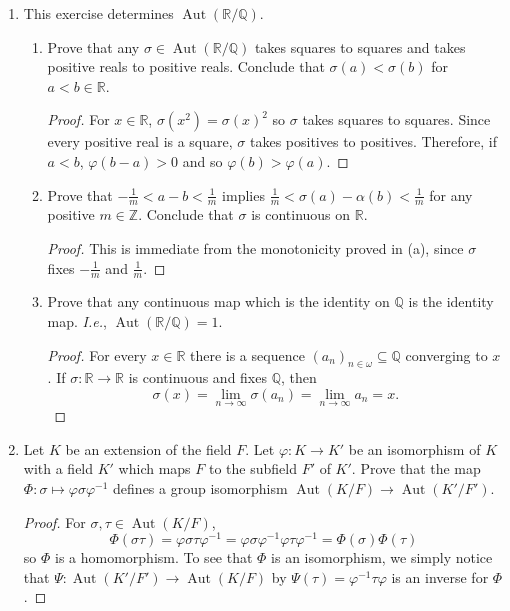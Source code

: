 \documentclass{report}
\newcommand{\Z}{\mathbb{Z}}
\newcommand{\Q}{\mathbb{Q}}
\newcommand{\R}{\mathbb{R}}
\DeclareMathOperator{\Aut}{Aut}
\begin{document}
\begin{enumerate}
\begin{enumerate} [label=(\alph*)]
		\end{enumerate}
	\item This exercise determines $\Aut(\R / \Q)$.
		\begin{enumerate} [label=(\alph*)]
			\item Prove that any $\sigma\in\Aut(\R/\Q)$ takes squares to squares and takes positive reals to positive reals. Conclude that $\sigma(a)<\sigma(b)$ for $a<b\in\R$. 
				\begin{proof}
					For $x\in\R$, $\sigma(x^2)=\sigma(x)^2$ so $\sigma$ takes squares to squares. Since every positive real is a square,
					$\sigma$ takes positives to positives. Therefore, if $a<b$, $\varphi(b-a)>0$ and so $\varphi(b)>\varphi(a)$.
				\end{proof}
			\item Prove that $-\frac{1}{m}<a-b<\frac{1}{m}$ implies $\frac{1}{m}<\sigma(a)-\alpha(b)<\frac{1}{m}$ for any positive $m\in\Z$.
				Conclude that $\sigma$ is continuous on $\R$.
				\begin{proof}
					This is immediate from the monotonicity proved in (a), since $\sigma$ fixes $- \frac{1}{m}$ and $\frac{1}{m}$. 
				\end{proof}
			\item Prove that any continuous map which is the identity on $\Q$ is the identity map. \textit{I.e.}, $\Aut(\R / \Q)=1$.
				\begin{proof}
					For every $x\in\R$ there is a sequence $(a_n)_{n \in\omega}\subseteq\Q$ converging to $x$.
					If $\sigma:\R\to\R$ is continuous and fixes $\Q$, then
					$$\sigma(x)=\lim_{n\to\infty}\sigma(a_n)=\lim_{n\to\infty}a_n=x.$$
				\end{proof}
		\end{enumerate}
		\setcounter{enumi}{9}
	\item Let $K$ be an extension of the field $F$. Let $\varphi:K\to K'$ be an isomorphism of $K$ with a field $K'$ which maps $F$ to the subfield $F'$ of $K'$.
		Prove that the map $\Phi:\sigma\mapsto \varphi\sigma\varphi^{-1}$ defines a group isomorphism $\Aut(K / F)\to \Aut(K'/F')$.
		\begin{proof}
			For $\sigma,\tau\in\Aut(K / F)$, 
			$$\Phi(\sigma\tau)=\varphi\sigma\tau\varphi^{-1}=\varphi\sigma\varphi^{-1}\varphi\tau\varphi^{-1}=\Phi(\sigma)\Phi(\tau)$$
			so $\Phi$ is a homomorphism. To see that $\Phi$ is an isomorphism, we simply notice that $\Psi:\Aut(K'/F')\to\Aut(K / F)$ by $\Psi(\tau)=\varphi^{-1}\tau\varphi$
			is an inverse for $\Phi$.
		\end{proof}
\end{enumerate}
\end{document}
